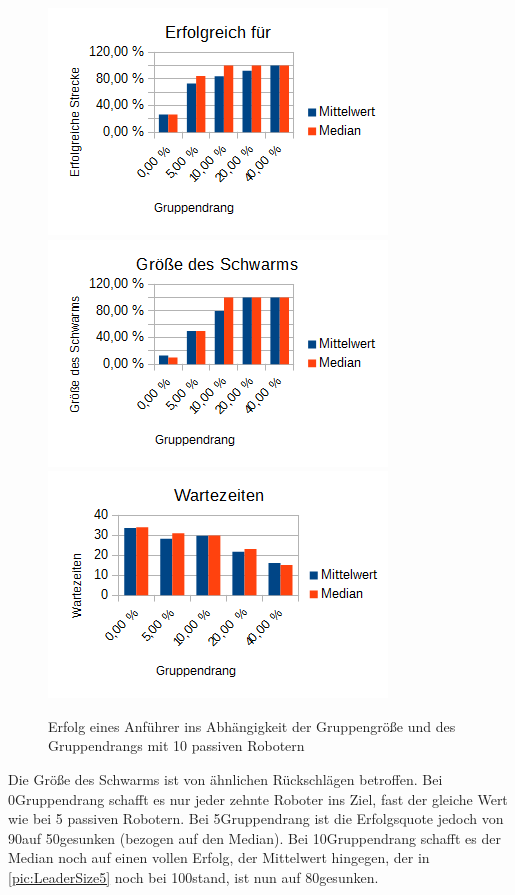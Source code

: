 \begin{figure}[h]
	\includegraphics[width=\sectionLeaderPictureWidth , height=\sectionLeaderPictureHeight]{graphics/Statistics/Leader/FlockSize/10_1.png}
	\includegraphics[width=\sectionLeaderPictureWidth , height=\sectionLeaderPictureHeight]{graphics/Statistics/Leader/FlockSize/10_2.png}
	\includegraphics[width=\sectionLeaderPictureWidth , height=\sectionLeaderPictureHeight]{graphics/Statistics/Leader/FlockSize/10_3.png}
	\caption{Erfolg eines Anführer ins Abhängigkeit der Gruppengröße und des Gruppendrangs mit 10 passiven Robotern}
	\label{pic:LeaderSize10}
\end{figure}

Die Größe des Schwarms ist von ähnlichen Rückschlägen betroffen. Bei 0\per Gruppendrang schafft es nur jeder zehnte Roboter ins Ziel, fast der gleiche Wert wie bei 5 passiven Robotern. Bei 5\per Gruppendrang ist die Erfolgsquote jedoch von 90\per auf 50\per gesunken (bezogen auf den Median).
Bei 10\per Gruppendrang schafft es der Median noch auf einen vollen Erfolg, der Mittelwert hingegen, der in \autoref{pic:LeaderSize5} noch bei 100\per stand, ist nun auf 80\per gesunken.

